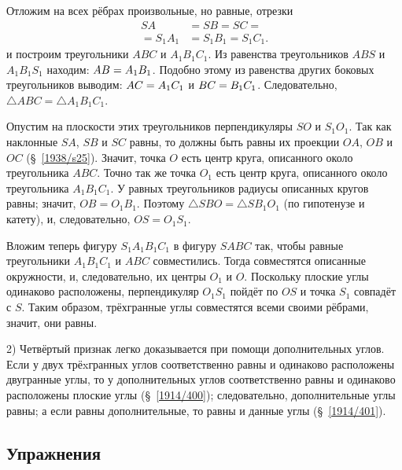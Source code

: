 Отложим на всех рёбрах произвольные, но равные, отрезки 
\begin{align*}SA &= SB = SC =
\\
 =S_1A_1 &=S_1B_1 = S_1C_1. 
\end{align*}
и построим треугольники $ABC$ и $A_1B_1C_1$.
Из равенства треугольников $ABS$ и $A_1B_1S_1$ находим: $AB \z= A_1B_1$.
Подобно этому из равенства других боковых треугольников выводим: $AC \z= A_1C_1$ и $BC\z=B_1C_1$.
Следовательно, $\triangle ABC=\triangle A_1B_1C_1$.

Опустим на плоскости этих треугольников перпендикуляры $SO$ и $S_1O_1$.
Так как наклонные $SA$, $SB$ и $SC$ равны, то должны быть равны их проекции $OA$, $OB$ и $OC$ (§~\ref{1938/s25}).
Значит, точка $O$ есть центр круга, описанного около треугольника $ABC$.
Точно так же точка $O_1$ есть центр круга, описанного около треугольника $A_1B_1C_1$.
У равных треугольников радиусы описанных кругов равны; значит, $OB = O_1B_1$.
Поэтому $\triangle SBO=\triangle SB_1O_1$ (по гипотенузе и катету), и, следовательно, $OS = O_1S_1$.

Вложим теперь фигуру $S_1A_1B_1C_1$ в фигуру $SABC$ так, чтобы равные треугольники $A_1B_1C_1$ и $ABC$ совместились.
Тогда совместятся описанные окружности, и, следовательно, их центры $O_1$ и $O$.
Поскольку плоские углы одинаково расположены, перпендикуляр $O_1S_1$ пойдёт по $OS$ и точка $S_1$ совпадёт с $S$.
Таким образом, трёхгранные углы совместятся всеми своими рёбрами, значит, они равны.

2) Четвёртый признак легко доказывается при помощи дополнительных углов.
Если у двух трёxгранных углов соответственно равны и одинаково расположены двугранные углы, то у дополнительных углов соответственно равны и одинаково расположены плоские углы (§~\ref{1914/400});
следовательно, дополнительные углы равны; а если равны дополнительные, то равны и данные углы (§~\ref{1914/401}).

\subsection*{Упражнения}


